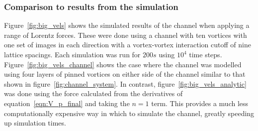 \documentclass{article}
\numberwithin{equation}{section}
\begin{document}
\subsubsection{Comparison to results from the simulation}
Figure~\ref{fig:big_vels} shows the simulated results of the channel when applying a range of Lorentz forces. These were done using a channel with ten vortices with one set of images in each direction with a vortex-vortex interaction cutoff of nine lattice spacings. Each simulation was run for $200s$ using $10^4$ time steps. Figure~\ref{fig:big_vels_channel} shows the case where the channel was modelled using four layers of pinned vortices on either side of the channel similar to that shown in figure~\ref{fig:channel_system}. In contrast, figure~\ref{fig:big_vels_analytic} was done using the force calculated from the derivatives of equation~\ref{eqn:V_p_final} and taking the $n=1$ term. This provides a much less computationally expensive way in which to simulate the channel, greatly speeding up simulation times.
\end{document}
